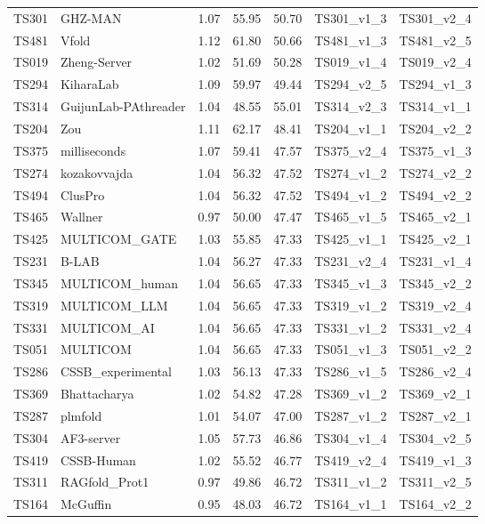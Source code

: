 \begin{longtable}{lllllll}
TS301 & GHZ-MAN & 1.07 & 55.95 & 50.70 & TS301\_v1\_3 & TS301\_v2\_4 \\ 
TS481 & Vfold & 1.12 & 61.80 & 50.66 & TS481\_v1\_3 & TS481\_v2\_5 \\ 
TS019 & Zheng-Server & 1.02 & 51.69 & 50.28 & TS019\_v1\_4 & TS019\_v2\_4 \\ 
TS294 & KiharaLab & 1.09 & 59.97 & 49.44 & TS294\_v2\_5 & TS294\_v1\_3 \\ 
TS314 & GuijunLab-PAthreader & 1.04 & 48.55 & 55.01 & TS314\_v2\_3 & TS314\_v1\_1 \\ 
TS204 & Zou & 1.11 & 62.17 & 48.41 & TS204\_v1\_1 & TS204\_v2\_2 \\ 
TS375 & milliseconds & 1.07 & 59.41 & 47.57 & TS375\_v2\_4 & TS375\_v1\_3 \\ 
TS274 & kozakovvajda & 1.04 & 56.32 & 47.52 & TS274\_v1\_2 & TS274\_v2\_2 \\ 
TS494 & ClusPro & 1.04 & 56.32 & 47.52 & TS494\_v1\_2 & TS494\_v2\_2 \\ 
TS465 & Wallner & 0.97 & 50.00 & 47.47 & TS465\_v1\_5 & TS465\_v2\_1 \\ 
TS425 & MULTICOM\_GATE & 1.03 & 55.85 & 47.33 & TS425\_v1\_1 & TS425\_v2\_1 \\ 
TS231 & B-LAB & 1.04 & 56.27 & 47.33 & TS231\_v2\_4 & TS231\_v1\_4 \\ 
TS345 & MULTICOM\_human & 1.04 & 56.65 & 47.33 & TS345\_v1\_3 & TS345\_v2\_2 \\ 
TS319 & MULTICOM\_LLM & 1.04 & 56.65 & 47.33 & TS319\_v1\_2 & TS319\_v2\_4 \\ 
TS331 & MULTICOM\_AI & 1.04 & 56.65 & 47.33 & TS331\_v1\_2 & TS331\_v2\_4 \\ 
TS051 & MULTICOM & 1.04 & 56.65 & 47.33 & TS051\_v1\_3 & TS051\_v2\_2 \\ 
TS286 & CSSB\_experimental & 1.03 & 56.13 & 47.33 & TS286\_v1\_5 & TS286\_v2\_4 \\ 
TS369 & Bhattacharya & 1.02 & 54.82 & 47.28 & TS369\_v1\_2 & TS369\_v2\_1 \\ 
TS287 & plmfold & 1.01 & 54.07 & 47.00 & TS287\_v1\_2 & TS287\_v2\_1 \\ 
TS304 & AF3-server & 1.05 & 57.73 & 46.86 & TS304\_v1\_4 & TS304\_v2\_5 \\ 
TS419 & CSSB-Human & 1.02 & 55.52 & 46.77 & TS419\_v2\_4 & TS419\_v1\_3 \\ 
TS311 & RAGfold\_Prot1 & 0.97 & 49.86 & 46.72 & TS311\_v1\_2 & TS311\_v2\_5 \\ 
TS164 & McGuffin & 0.95 & 48.03 & 46.72 & TS164\_v1\_1 & TS164\_v2\_2 \\ 

\end{longtable}
